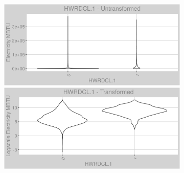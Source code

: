 \newpage
\begin{figure}
\centering
\begin{subfigure}{1\textwidth}
\centering
\includegraphics[width=.49\textwidth, height=0.3\textheight]{Images/electricity_var_original_20.png}
\includegraphics[width=.49\textwidth, height=0.3\textheight]{Images/electricity_var_transformed_20.png}
\end{subfigure}
\end{figure}